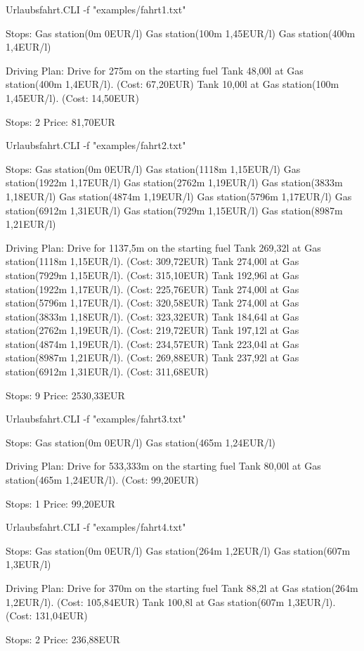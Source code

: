 \documentclass[a4paper,10pt,ngerman]{scrartcl}
\begin{document}
\begin{lstcs}
Urlaubsfahrt.CLI -f "examples/fahrt1.txt"

Stops:
  Gas station(0m 0EUR/l)
  Gas station(100m 1,45EUR/l)
  Gas station(400m 1,4EUR/l)

Driving Plan:
  Drive for 275m on the starting fuel
  Tank 48,00l at Gas station(400m 1,4EUR/l). (Cost: 67,20EUR)
  Tank 10,00l at Gas station(100m 1,45EUR/l). (Cost: 14,50EUR)

  Stops: 2
  Price: 81,70EUR
\end{lstcs}
\begin{lstcs}
    Urlaubsfahrt.CLI -f "examples/fahrt2.txt"

Stops:
  Gas station(0m 0EUR/l)
  Gas station(1118m 1,15EUR/l)
  Gas station(1922m 1,17EUR/l)
  Gas station(2762m 1,19EUR/l)
  Gas station(3833m 1,18EUR/l)
  Gas station(4874m 1,19EUR/l)
  Gas station(5796m 1,17EUR/l)
  Gas station(6912m 1,31EUR/l)
  Gas station(7929m 1,15EUR/l)
  Gas station(8987m 1,21EUR/l)

Driving Plan:
  Drive for 1137,5m on the starting fuel
  Tank 269,32l at Gas station(1118m 1,15EUR/l). (Cost: 309,72EUR)
  Tank 274,00l at Gas station(7929m 1,15EUR/l). (Cost: 315,10EUR)
  Tank 192,96l at Gas station(1922m 1,17EUR/l). (Cost: 225,76EUR)
  Tank 274,00l at Gas station(5796m 1,17EUR/l). (Cost: 320,58EUR)
  Tank 274,00l at Gas station(3833m 1,18EUR/l). (Cost: 323,32EUR)
  Tank 184,64l at Gas station(2762m 1,19EUR/l). (Cost: 219,72EUR)
  Tank 197,12l at Gas station(4874m 1,19EUR/l). (Cost: 234,57EUR)
  Tank 223,04l at Gas station(8987m 1,21EUR/l). (Cost: 269,88EUR)
  Tank 237,92l at Gas station(6912m 1,31EUR/l). (Cost: 311,68EUR)

  Stops: 9
  Price: 2530,33EUR
\end{lstcs}
\begin{lstcs}
    Urlaubsfahrt.CLI -f "examples/fahrt3.txt"

Stops:
  Gas station(0m 0EUR/l)
  Gas station(465m 1,24EUR/l)

Driving Plan:
  Drive for 533,333m on the starting fuel
  Tank 80,00l at Gas station(465m 1,24EUR/l). (Cost: 99,20EUR)

  Stops: 1
  Price: 99,20EUR
\end{lstcs}
\begin{lstcs}
    Urlaubsfahrt.CLI -f "examples/fahrt4.txt"

Stops:
  Gas station(0m 0EUR/l)
  Gas station(264m 1,2EUR/l)
  Gas station(607m 1,3EUR/l)

Driving Plan:
  Drive for 370m on the starting fuel
  Tank 88,2l at Gas station(264m 1,2EUR/l). (Cost: 105,84EUR)
  Tank 100,8l at Gas station(607m 1,3EUR/l). (Cost: 131,04EUR)

  Stops: 2
  Price: 236,88EUR
\end{lstcs}
\end{document}
